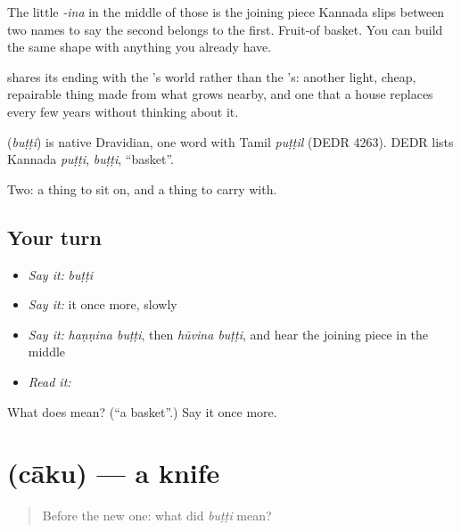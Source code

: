 The little \emph{-ina} in the middle of those is the joining piece Kannada slips between two names to say the second belongs to the first. Fruit-of basket. You can build the same shape with anything you already have.

 shares its ending with the 's world rather than the 's: another light, cheap, repairable thing made from what grows nearby, and one that a house replaces every few years without thinking about it.

\begin{cousinweb}
\textbf{} (\emph{buṭṭi}) is native Dravidian, one word with Tamil \emph{puṭṭil} (DEDR 4263). DEDR lists Kannada \emph{puṭṭi}, \emph{buṭṭi}, \textquotedblleft{}basket\textquotedblright{}.
\end{cousinweb}

\begin{grammarlens}[title={What you've built}]
Two: a thing to sit on, and a thing to carry with.
\end{grammarlens}

\subsection*{Your turn}
\begin{itemize}
\raggedright
  \item \emph{Say it:} \emph{buṭṭi}
  \item \emph{Say it:} it once more, slowly
  \item \emph{Say it:} \emph{haṇṇina buṭṭi}, then \emph{hūvina buṭṭi}, and hear the joining piece in the middle
  \item \emph{Read it:} \textbf{}
\end{itemize}

\begin{tcolorbox}[breakable,colback=teal!4,colframe=teal!35!black,title={Before you move on}]
What does  mean? (\textquotedblleft{}a basket\textquotedblright{}.) Say it once more.
\end{tcolorbox}
\section[\texorpdfstring{\kn{ಚಾಕು} (cāku)}{ಚಾಕು (cāku)}]{ (cāku) — a knife}

\label{lesson:KA-C56-knife}



\begin{quote}
Before the new one: what did \emph{buṭṭi} mean?
\end{quote}

